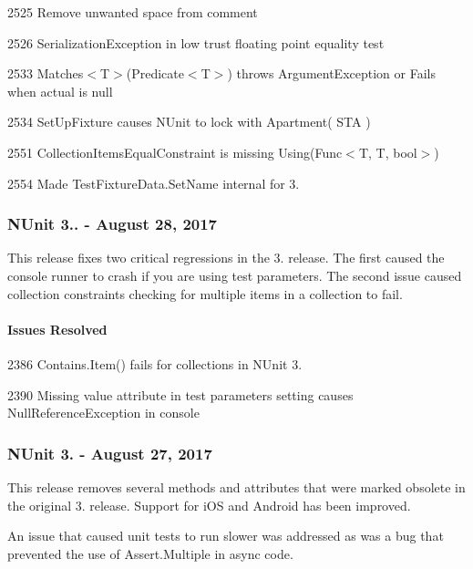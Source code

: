 \begin{DoxyItemize}
\item 2525 Remove unwanted space from comment
\item 2526 Serialization\+Exception in low trust floating point equality test
\item 2533 Matches$<$\+T$>$(\+Predicate$<$\+T$>$) throws Argument\+Exception or Fails when actual is null
\item 2534 Set\+Up\+Fixture causes N\+Unit to lock with Apartment( S\+T\+A )
\item 2551 Collection\+Items\+Equal\+Constraint is missing Using(\+Func$<$\+T, T, bool$>$)
\item 2554 Made Test\+Fixture\+Data.\+Set\+Name internal for 3.
\end{DoxyItemize}

\subsubsection*{N\+Unit 3.. -\/ August 28, 2017}

This release fixes two critical regressions in the 3. release. The first caused the console runner to crash if you are using test parameters. The second issue caused collection constraints checking for multiple items in a collection to fail.

\paragraph*{Issues Resolved}


\begin{DoxyItemize}
\item 2386 Contains.\+Item() fails for collections in N\+Unit 3.
\item 2390 Missing value attribute in test parameters setting causes Null\+Reference\+Exception in console
\end{DoxyItemize}

\subsubsection*{N\+Unit 3. -\/ August 27, 2017}

This release removes several methods and attributes that were marked obsolete in the original 3. release. Support for i\+OS and Android has been improved.

An issue that caused unit tests to run slower was addressed as was a bug that prevented the use of Assert.\+Multiple in async code.


